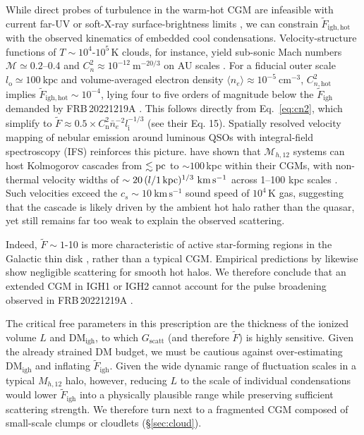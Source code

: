 \documentclass[twocolumn, linenumbers, tra]{aastex631}
\newcommand{\nihari}{FRB\,20221219A } %
\begin{document}
{While direct probes of turbulence in the warm-hot CGM are infeasible with current far-UV or soft-X-ray surface-brightness limits \citep{Tumlinson2017,erosita2024}, we can constrain $\widetilde{F}_{\mathrm{igh, hot}}$ with the observed kinematics of embedded cool condensations. Velocity-structure functions of $T \sim 10^{4}$-$10^{5}\,$K clouds, for instance, yield sub-sonic Mach numbers $\mathcal{M} \simeq 0.2$--0.4 and $C_{n}^{2} \approx 10^{-12}\ \mathrm{m^{-20/3}}$ on AU scales \citep{Chen2023,MChen2024,Ocker2025}. For a fiducial outer scale $l_{\mathrm{o}} \simeq 100\ \mathrm{kpc}$ and volume-averaged electron density $\langle n_{e}\rangle \approx 10^{-5}\ \mathrm{cm^{-3}}$, $C_{n,\mathrm{hot}}^{2}$ implies $\widetilde{F}_{\mathrm{igh, hot}} \sim 10^{-4}$, lying four to five orders of magnitude below the $\widetilde{F}_{\mathrm{igh}}$ demanded by \nihari. This follows directly from Eq.~\ref{eq:cn2}, which \citet{Ocker2025} simplify to $\widetilde{F} \approx 0.5 \times C_{\mathrm{n}}^2\bar{n}_e^{-2}l_{\mathrm{i}}^{-1 / 3}$ (see their Eq. 15). Spatially resolved velocity mapping of nebular emission around luminous QSOs with integral-field spectroscopy (IFS) reinforces this picture. \cite{Chen2023} have shown that $\mathcal{M}_{h, 12}$ systems can host Kolmogorov cascades from $\lesssim{\rm pc}$ to $ \sim 100\,$kpc within their CGMs, with non-thermal velocity widths of $ \sim 20\,(l/1\,{\rm kpc})^{1/3}\ \mathrm{km\,s^{-1}}$ across 1--100 kpc scales \citep[i.e. $ \sim 20$--$100\ \mathrm{km\,s^{-1}}$; ][]{MChen2024}. Such velocities exceed the $c_{s} \sim 10\ \mathrm{km\,s^{-1}}$ sound speed of $10^{4}\,$K gas, suggesting that the cascade is likely driven by the ambient hot halo rather than the quasar, yet still remains far too weak to explain the observed scattering.

Indeed, $\widetilde{F} \sim 1$-10 is more characteristic of active star-forming regions in the Galactic thin disk \citep[e.g.\ HII regions;][]{Ocker2024}, rather than a typical CGM. Empirical predictions by \citet{Ocker2025} likewise show negligible scattering for smooth hot halos. We therefore conclude that an extended CGM in IGH1 or IGH2 cannot account for the pulse broadening observed in \nihari.

The critical free parameters in this prescription are the thickness of the ionized volume $L$ and $\mathrm{DM}_{\mathrm{igh}}$, to which $G_{\mathrm{scatt}}$ (and therefore $\widetilde{F}$) is highly sensitive. Given the already strained DM budget, we must be cautious against over-estimating $\mathrm{DM}_{\mathrm{igh}}$ and inflating $\widetilde{F}_{\mathrm{igh}}$. Given the wide dynamic range of fluctuation scales in a typical $M_{h,12}$ halo, however, reducing $L$ to the scale of individual condensations would lower $\widetilde{F}_{\mathrm{igh}}$ into a physically plausible range while preserving sufficient scattering strength. We therefore turn next to a fragmented CGM composed of small-scale clumps or cloudlets (\S\ref{sec:cloud}).}
\end{document}
